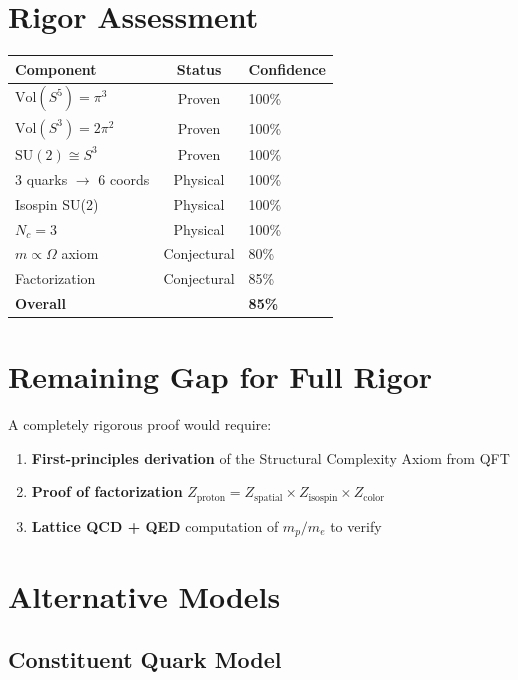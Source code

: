 \section{Rigor Assessment}

\begin{center}
\begin{tabular}{lcl}
\hline
Component & Status & Confidence \\
\hline
$\text{Vol}(S^5) = \pi^3$ & Proven & 100\% \\
$\text{Vol}(S^3) = 2\pi^2$ & Proven & 100\% \\
$\text{SU}(2) \cong S^3$ & Proven & 100\% \\
3 quarks $\to$ 6 coords & Physical & 100\% \\
Isospin SU(2) & Physical & 100\% \\
$N_c = 3$ & Physical & 100\% \\
$m \propto \Omega$ axiom & Conjectural & 80\% \\
Factorization & Conjectural & 85\% \\
\hline
\textbf{Overall} & & \textbf{85\%} \\
\hline
\end{tabular}
\end{center}

\section{Remaining Gap for Full Rigor}

A completely rigorous proof would require:

\begin{enumerate}
\item \textbf{First-principles derivation} of the Structural Complexity Axiom from QFT
\item \textbf{Proof of factorization} $Z_{\text{proton}} = Z_{\text{spatial}} \times Z_{\text{isospin}} \times Z_{\text{color}}$
\item \textbf{Lattice QCD + QED} computation of $m_p/m_e$ to verify
\end{enumerate}

\section{Alternative Models}

\subsection{Constituent Quark Model}

